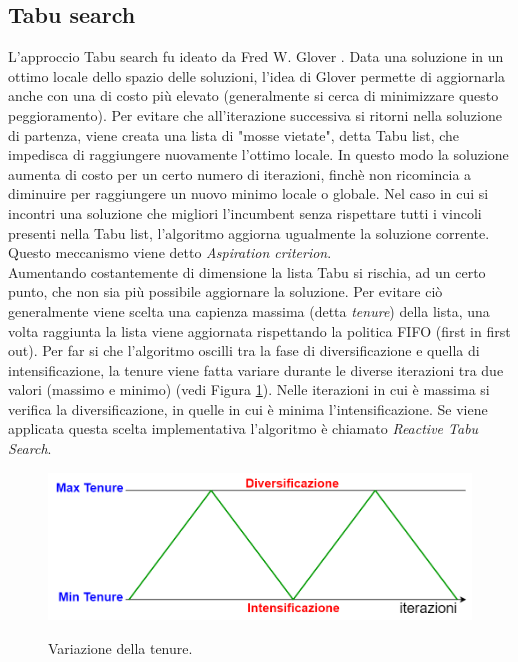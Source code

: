 \subsection{Tabu search}%
L'approccio Tabu search fu ideato da Fred W. Glover \cite{Tabu}. Data una soluzione in un ottimo locale dello spazio delle soluzioni, l'idea di Glover permette di aggiornarla anche con una di costo più elevato (generalmente si cerca di minimizzare questo peggioramento). Per evitare che all'iterazione successiva si ritorni nella soluzione di partenza, viene creata una lista di "mosse vietate", detta Tabu list, che impedisca di raggiungere nuovamente l'ottimo locale. In questo modo la soluzione aumenta di costo per un certo numero di iterazioni, finchè non ricomincia a diminuire per raggiungere un nuovo minimo locale o globale. Nel caso in cui si incontri una soluzione che migliori l'incumbent senza rispettare tutti i vincoli presenti nella Tabu list, l'algoritmo aggiorna ugualmente la soluzione corrente. Questo meccanismo viene detto \textit{Aspiration criterion}.\\ 
Aumentando costantemente di dimensione la lista Tabu si rischia, ad un certo punto, che non sia più possibile aggiornare la soluzione. Per evitare ciò generalmente viene scelta una capienza massima (detta \textit{tenure}) della lista, una volta raggiunta la lista viene aggiornata rispettando la politica FIFO (first in first out). Per far si che l'algoritmo oscilli tra la fase di diversificazione e quella di intensificazione, la tenure viene fatta variare durante le diverse iterazioni tra due valori (massimo e minimo) (vedi Figura \ref{tenure}). Nelle iterazioni in cui è massima si verifica la diversificazione, in quelle in cui è minima l'intensificazione. Se viene applicata questa scelta implementativa l'algoritmo è chiamato \textit{Reactive Tabu Search}.
 \begin{figure}[H] 
\begin{center} 
  \includegraphics[scale=0.35]{Images/tenure}\\ 
  \caption{\footnotesize{Variazione della tenure.}}
  \label{tenure}
\end{center}
\end{figure}
